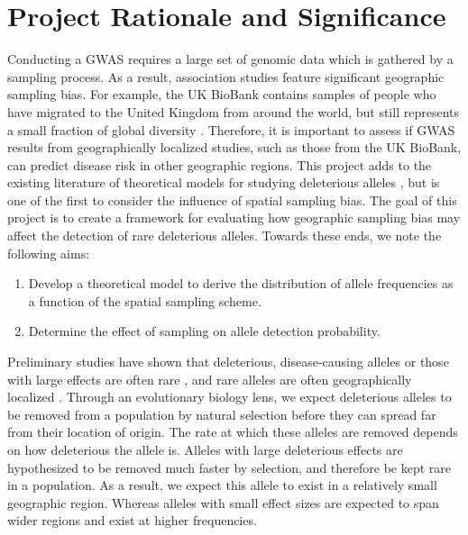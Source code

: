 \section{Project Rationale and Significance}
Conducting a GWAS requires a large set of genomic data which is gathered by a sampling process. As a result, association studies feature significant geographic sampling bias. For example, the UK BioBank contains samples of people who have migrated to the United Kingdom from around the world, but still represents a small fraction of global diversity \cite{bycroft_uk_2018}. Therefore, it is important to assess if GWAS results from geographically localized studies, such as those from the UK BioBank, can predict disease risk in other geographic regions. This project adds to the existing literature of theoretical models for studying deleterious alleles \cite{eyre-walker_evolution_2010} \cite{pritchard_are_2001}\cite{simons_population_2018}, but is one of the first to consider the influence of spatial sampling bias. The goal of this project is to create a framework for evaluating how geographic sampling bias may affect the detection of rare deleterious alleles. Towards these ends, we note the following aims:	

\begin{enumerate}
    \item Develop a theoretical model to derive the distribution of allele frequencies as a function of the spatial sampling scheme.
    \item Determine the effect of sampling on allele detection probability.
\end{enumerate}


Preliminary studies have shown that deleterious, disease-causing alleles or those with large effects are often rare \cite{marouli_rare_2017} \cite{slatkin_estimating_2000}, and rare alleles are often geographically localized \cite{visscher_r.._2019}\cite{slatkin_spatial_1978}. Through an evolutionary biology lens, we expect deleterious alleles to be removed from a population by natural selection before they can spread far from their location of origin. The rate at which these alleles are removed depends on how deleterious the allele is. Alleles with large deleterious effects are hypothesized to be removed much faster by selection, and therefore be kept rare in a population. As a result, we expect this allele to exist in a relatively small geographic region. Whereas alleles with small effect sizes are expected to span wider regions and exist at higher frequencies. 

